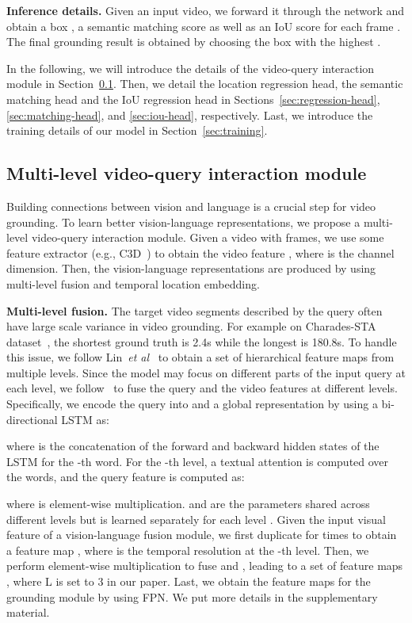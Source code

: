 \documentclass[10pt,twocolumn,letterpaper]{article}
\def\etal{\emph{et al}\onedot}
\begin{document}
	\textbf{Inference details.} Given an input video, we 
forward it through the network and obtain a box , a semantic matching score  as well as an IoU score  for each frame . The final grounding result is obtained by choosing the box with the highest .
	
	In the following, we will introduce the details of the video-query interaction module in Section~\ref{sec:feature}. Then, we
	detail the location regression head, the semantic matching head  and the IoU regression head in Sections~\ref{sec:regression-head},  \ref{sec:matching-head}, and \ref{sec:iou-head}, respectively. Last, we introduce the training details of our model in Section~\ref{sec:training}. 
	
		\subsection{Multi-level video-query interaction module}
	\label{sec:feature}
	
	Building connections between vision and language is a crucial step for video grounding. To learn better vision-language representations, we propose a  multi-level video-query interaction module.
	Given a video with  frames, we use some feature extractor (e.g., C3D~\cite{tran2015learning}) to obtain the video feature , where  is the channel dimension.  Then, the vision-language representations are produced by using multi-level fusion and temporal location embedding.
	
	\noindent \textbf{Multi-level fusion.}  The target video segments described by the query often have large scale variance in video grounding. For example on Charades-STA dataset~\cite{gao2017tall}, the shortest ground truth is 2.4s while the longest is 180.8s. To handle this issue, we follow Lin~\etal~\cite{lin2017feature} to obtain a set of hierarchical feature maps from multiple levels.
	Since the model may focus on different parts of the input query at each level, we follow~\cite{hu2018explainable} to fuse the query and the video features at different levels.
	Specifically, we encode the query  into  and a global representation  by using a bi-directional LSTM as:
	
	where 
	is the concatenation of the forward and backward hidden states of the LSTM for the -th word. For the -th level, a textual attention  is computed over the words, and the query feature  is computed as:
	
	where  is element-wise multiplication.  and  are the parameters shared across different levels but  is learned separately for each level . Given the input visual feature  of a vision-language fusion module, we first duplicate  for  times to obtain a feature map , where  is the temporal resolution at the -th level. Then, we perform element-wise multiplication to fuse  and , leading to a set of feature maps , where L is set to 3 in our paper. Last, we obtain the feature maps  for the grounding module by using FPN. We put more details in the supplementary material.
\end{document}
